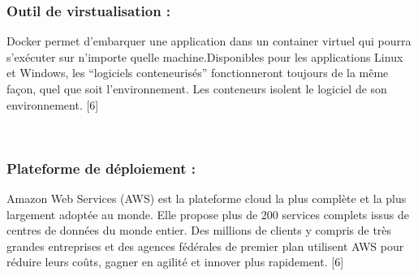 \documentclass{article}
\begin{document}
{\subsubsection{Outil de virstualisation : }
\begin{minipage}{0.15\textwidth}
	\begin{minipage}{\linewidth}
	\end{minipage}
\end{minipage}
\hfill
\begin{minipage}{0.75\textwidth}
\vspace{0.5cm}
Docker permet d’embarquer une application dans un container virtuel qui pourra s’exécuter sur n’importe quelle machine.Disponibles pour les applications Linux et Windows, les “logiciels conteneurisés” fonctionneront toujours de la même façon, quel que soit l’environnement. Les conteneurs isolent le logiciel de son environnement. [6]\\
\end{minipage}\\

\vspace{5cm}
\subsubsection{Plateforme de déploiement : }
\begin{minipage}{0.15\textwidth}
	\begin{minipage}{\linewidth}
	\end{minipage}
\end{minipage}
\hfill
\begin{minipage}{0.75\textwidth}
\vspace{0.5cm}
Amazon Web Services (AWS) est la plateforme cloud la plus complète et la plus largement adoptée au monde. Elle propose plus de 200 services complets issus de centres de données du monde entier. Des millions de clients y compris de très grandes entreprises et des agences fédérales de premier plan utilisent AWS pour réduire leurs coûts, gagner en agilité et innover plus rapidement. [6]\\
\end{minipage}\\

}
\end{document}
